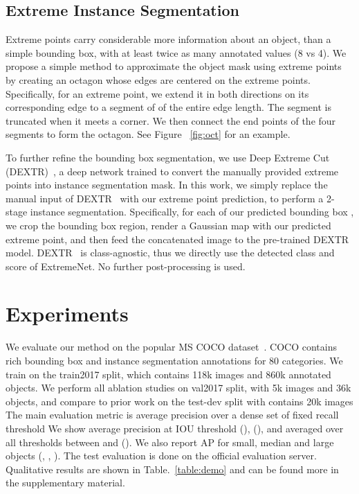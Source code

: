 \documentclass[10pt,twocolumn,letterpaper]{article}
\newcommand\hide[1]{}
\begin{document}
\subsection{Extreme Instance Segmentation}

\label{sec:ins}

Extreme points carry considerable more information about an object, than a simple bounding box, with at least twice as many annotated values (8 vs 4).
We propose a simple method to approximate the object mask using extreme points by creating an octagon whose edges are centered on the extreme points.
Specifically, for an extreme point, we extend it in both directions on its corresponding edge to a segment of  of the entire edge length.
The segment is truncated when it meets a corner. 
We then connect the end points of the four segments to form the octagon. 
See Figure ~\ref{fig:oct} for an example. 

To further refine the bounding box segmentation, we use Deep Extreme Cut (DEXTR)~\cite{Man+18}, a deep network trained to convert the manually provided extreme points into instance segmentation mask.
In this work, we simply replace the manual input of DEXTR~\cite{Man+18} with our extreme point prediction, to perform a 2-stage instance segmentation.
Specifically, for each of our predicted bounding box \hide{with a score }, we crop the bounding box region, render a Gaussian map with our predicted extreme point, and then feed the concatenated image to the pre-trained DEXTR model. 
DEXTR~\cite{Man+18} is class-agnostic, thus we directly use the detected class and score of ExtremeNet.
No further post-processing is used. 

\section{Experiments}

We evaluate our method on the popular MS COCO dataset~\cite{lin2014microsoft}. 
COCO contains rich bounding box and instance segmentation annotations for 80 categories. 
We train on the train2017 split, which contains 118k images and 860k annotated objects.
We perform all ablation studies on val2017 split, with 5k images and 36k objects, and compare to prior work on the test-dev split with contains 20k images
The main evaluation metric is average precision over a dense set of fixed recall threshold
We show average precision at IOU threshold  (),  (), and averaged over all thresholds between  and  ().
We also report AP for small, median and large objects (, , ).
The test evaluation is done on the official evaluation server. 
Qualitative results are shown in Table.~\ref{table:demo} and can be found more in the supplementary material.
\end{document}
